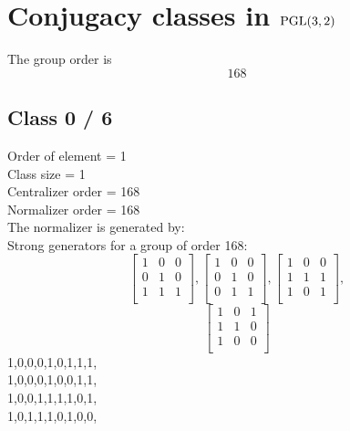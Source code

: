 
\section{Conjugacy classes in ${\rm PGL}(3,2)$}
\label{app:classes}
The group order is 
$$
168
$$
\bigskip
\subsection*{Class 0 / 6}
Order of element = 1\\
Class size = 1\\
Centralizer order = 168\\
Normalizer order = 168\\
The normalizer is generated by:\\
Strong generators for a group of order 168:
$$
\left[
\begin{array}{*{3}{r}}
1 & 0 & 0\\
0 & 1 & 0\\
1 & 1 & 1\\
\end{array}
\right]
, 
\left[
\begin{array}{*{3}{r}}
1 & 0 & 0\\
0 & 1 & 0\\
0 & 1 & 1\\
\end{array}
\right]
, 
\left[
\begin{array}{*{3}{r}}
1 & 0 & 0\\
1 & 1 & 1\\
1 & 0 & 1\\
\end{array}
\right]
, 
$$
$$
\left[
\begin{array}{*{3}{r}}
1 & 0 & 1\\
1 & 1 & 0\\
1 & 0 & 0\\
\end{array}
\right]
$$
1,0,0,0,1,0,1,1,1,\\
1,0,0,0,1,0,0,1,1,\\
1,0,0,1,1,1,1,0,1,\\
1,0,1,1,1,0,1,0,0,\\
\bigskip
